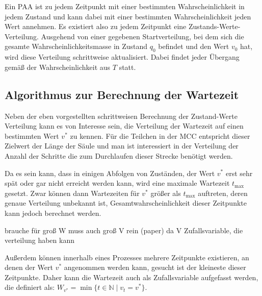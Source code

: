Ein PAA ist zu jedem Zeitpunkt mit einer bestimmten Wahrscheinlichkeit in jedem Zustand und kann dabei mit einer bestimmten Wahrscheinlichkeit jeden Wert annehmen. Es existiert also zu jedem Zeitpunkt eine Zustands-Werte-Verteilung. Ausgehend von einer gegebenen Startverteilung, bei dem sich die gesamte Wahrscheinlichkeitsmasse in Zustand $q_0$ befindet und den Wert $v_0$ hat, wird diese Verteilung schrittweise aktualisiert. Dabei findet jeder Übergang gemäß der Wahrscheinlichkeit aus $T$ statt. %

% 
% 
% 

\subsection{Algorithmus zur Berechnung der Wartezeit}

Neben der eben vorgestellten schrittweisen Berechnung der Zustand-Werte Verteilung kann es von Interesse sein, die Verteilung der Wartezeit auf einen bestimmten Wert $v^*$ zu kennen. Für die Teilchen in der MCC entspricht dieser Zielwert der Länge der Säule und man ist interessiert in der Verteilung der Anzahl der Schritte die zum Durchlaufen dieser Strecke benötigt werden. 

Da es sein kann, dass in einigen Abfolgen von Zuständen, der Wert $v^*$ erst sehr spät oder gar nicht erreicht werden kann, wird eine maximale Wartezeit $t_{\text{max}}$ gesetzt. Zwar können dann Wartezeiten für $v^*$ größer als $t_{\text{max}}$ auftreten, deren genaue Verteilung unbekannt ist, Gesamtwahrscheinlichkeit dieser Zeitpunkte kann jedoch berechnet werden.

brauche für groß W muss auch groß V rein (paper) da V Zufallsvariable, die verteilung haben kann

Außerdem können innerhalb eines Prozesses mehrere Zeitpunkte existieren, an denen der Wert $v^*$ angenommen werden kann, gesucht ist der kleineste dieser Zeitpunkte. %
Daher kann die Wartezeit auch als Zufallsvariable aufgefasst werden, die definiert als: $W_{v^*} = \min\{t \in \mathbb{N}\mid v_t = v^*\}$.

